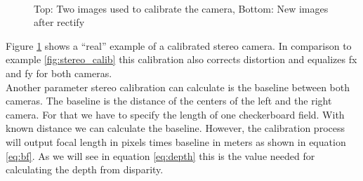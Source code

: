 \documentclass[11pt,a4paper,titlepage,oneside]{report}
\begin{document}
\begin{figure}[H]
	\centering
	\\
	\caption{Top: Two images used to calibrate the camera, Bottom: New images after rectify}\label{fig:calibration_real}
\end{figure}

Figure \ref{fig:calibration_real} shows a ``real'' example of a calibrated stereo camera. In comparison to example \ref{fig:stereo_calib} this calibration also corrects distortion and equalizes fx and fy for both cameras.\\

Another parameter stereo calibration can calculate is the baseline between both cameras. The baseline is the distance of the centers of the left and the right camera. For that we have to specify the length of one checkerboard field. With known distance we can calculate the baseline. However, the calibration process will output focal length in pixels times baseline in meters as shown in equation \ref{eq:bf}. As we will see in equation \ref{eq:depth} this is the value needed for calculating the depth from disparity.
\end{document}
